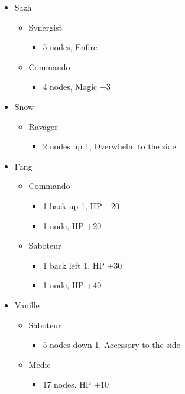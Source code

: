 \begin{menu}
\begin{itemize}
    \crystarium
    \begin{itemize}
        \item Sazh
        \begin{itemize}
            \item Synergist
            \begin{itemize}
                \item 5 nodes, Enfire
            \end{itemize}
            \item Commando
            \begin{itemize}
                \item 4 nodes, Magic +3
            \end{itemize}
        \end{itemize}
        \item Snow
        \begin{itemize}
            \item Ravager
            \begin{itemize}
                \item 2 nodes up 1, Overwhelm to the side
            \end{itemize}
        \end{itemize}
        \item Fang
        \begin{itemize}
            \item Commando
            \begin{itemize}
                \item 1 back up 1, HP +20
                \item 1 node, HP +20
            \end{itemize}
            \item Saboteur
            \begin{itemize}
                \item 1 back left 1, HP +30
                \item 1 node, HP +40
            \end{itemize}
        \end{itemize}
        \item Vanille
        \begin{itemize}
            \item Saboteur
            \begin{itemize}
                \item 5 nodes down 1, Accessory to the side
            \end{itemize}
            \item Medic
            \begin{itemize}
                \item 17 nodes, HP +10
            \end{itemize}
        \end{itemize}
    \end{itemize}
    
\end{itemize}
\end{menu}

